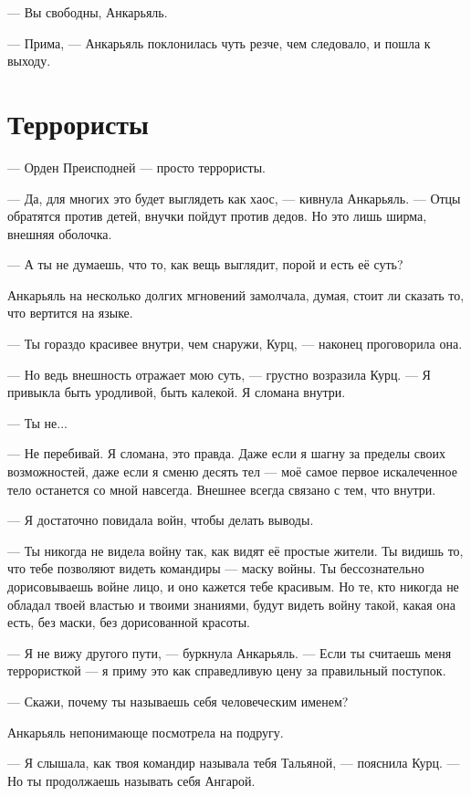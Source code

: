 \documentclass[a4paper,10pt,fleqn]{book}\usepackage{polyglossia}\setdefaultlanguage{english}\setotherlanguage{russian}\defaultfontfeatures{Ligatures=TeX,Mapping=tex-text}\usepackage{xcolor}\definecolor{lightgray}{HTML}{bbbbbb}\color{lightgray}\newcommand{\ml}[3]{\textcolor{black}{#3}}
\begin{document}
--- Вы свободны, Анкарьяль.

--- Прима, --- Анкарьяль поклонилась чуть резче, чем следовало, и пошла к выходу.

\section{Террористы}

--- Орден Преисподней --- просто террористы.

--- Да, для многих это будет выглядеть как хаос, --- кивнула Анкарьяль.
--- Отцы обратятся против детей, внучки пойдут против дедов.
Но это лишь ширма, внешняя оболочка.

--- А ты не думаешь, что то, как вещь выглядит, порой и есть её суть?

Анкарьяль на несколько долгих мгновений замолчала, думая, стоит ли сказать то, что вертится на языке.

--- Ты гораздо красивее внутри, чем снаружи, Курц, --- наконец проговорила она.

--- Но ведь внешность отражает мою суть, --- грустно возразила Курц.
--- Я привыкла быть уродливой, быть калекой.
Я сломана внутри.

--- Ты не...

--- Не перебивай.
Я сломана, это правда.
Даже если я шагну за пределы своих возможностей, даже если я сменю десять тел --- моё самое первое искалеченное тело останется со мной навсегда.
Внешнее всегда связано с тем, что внутри.

--- Я достаточно повидала войн, чтобы делать выводы.

--- Ты никогда не видела войну так, как видят её простые жители.
Ты видишь то, что тебе позволяют видеть командиры --- маску войны.
Ты бессознательно дорисовываешь войне лицо, и оно кажется тебе красивым.
Но те, кто никогда не обладал твоей властью и твоими знаниями, будут видеть войну такой, какая она есть, без маски, без дорисованной красоты.

--- Я не вижу другого пути, --- буркнула Анкарьяль.
--- Если ты считаешь меня террористкой --- я приму это как справедливую цену за правильный поступок.

--- Скажи, почему ты называешь себя человеческим именем?

Анкарьяль непонимающе посмотрела на подругу.

--- Я слышала, как твоя командир называла тебя Тальяной, --- пояснила Курц.
--- Но ты продолжаешь называть себя Ангарой.
\end{document}
